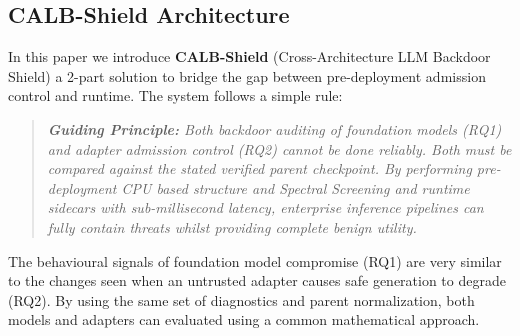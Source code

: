 \documentclass[conference]{IEEEtran}
\begin{document}
\subsection{CALB-Shield Architecture}
In this paper we introduce \textbf{CALB-Shield} (Cross-Architecture LLM Backdoor Shield) a 2-part solution to bridge the gap between pre-deployment admission control and runtime. The system follows a simple rule:

\begin{quote}
\textit{\textbf{Guiding Principle:} Both backdoor auditing of foundation models (RQ1) and adapter admission control (RQ2) cannot be done reliably. Both must be compared against the stated verified parent checkpoint. By performing pre-deployment CPU based structure and Spectral Screening and runtime sidecars with sub-millisecond latency, enterprise inference pipelines can fully contain threats whilst providing complete benign utility.}
\end{quote}

The behavioural signals of foundation model compromise (RQ1) are very similar to the changes seen when an untrusted adapter causes safe generation to degrade (RQ2). By using the same set of diagnostics and parent normalization, both models and adapters can evaluated using a common mathematical approach.
\end{document}
